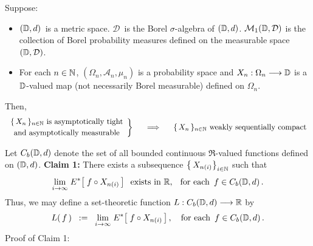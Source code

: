\begin{theorem}
\mbox{}\vskip 0.1cm
\noindent
Suppose:
\begin{itemize}
\item
	$(\mathbb{D},d)$\, is a metric space.
	$\mathcal{D}$\, is the Borel $\sigma$-algebra of $(\mathbb{D},d)$.
	\vskip 0.0cm
	$\mathcal{M}_{1}(\mathbb{D},\mathcal{D})$ is the collection of Borel probability measures
	defined on the measurable space $(\mathbb{D},\mathcal{D})$.
\item
	For each $n \in \mathbb{N}$,
	$(\Omega_{n},\mathcal{A}_{n},\mu_{n})$ is a probability space and
	$X_{n} : \Omega_{n} \longrightarrow \mathbb{D}$
	is a $\mathbb{D}$-valued map (not necessarily Borel measurable) defined on $\Omega_{n}$.
\end{itemize}
Then,
\begin{equation*}
	\left.\begin{array}{c}
	\textnormal{$\{\,X_{n}\,\}_{n\in\N}$ is asymptotically tight}
	\\
	\overset{{\color{white}.}}{\textnormal{and asymptotically measurable}}
	\end{array}\right\}
\quad\;\;\Longrightarrow\quad
	\begin{array}{c}
	\textnormal{$\{\,X_{n}\,\}_{n\in\N}$ weakly sequentially compact}
	\end{array}
\end{equation*}
\end{theorem}
\proof
Let $C_{b}(\mathbb{D},d)$ denote the set of all bounded continuous $\Re$-valued
functions defined on $(\mathbb{D},d)$.
\vskip 0.3cm
\noindent
\textbf{Claim 1:}\;\;
There exists a subsequence $\left\{\,X_{n(i)}\right\}_{i\in\mathbb{N}}$ such that
\begin{equation*}
\underset{i\rightarrow\infty}{\lim}\; E^{*}\!\left[\; f \circ X_{n(i)} \,\right]
\;\;\textnormal{exists in $\mathbb{R}$, \; for each \,$f \in C_{b}(\mathbb{D},d)$}\,.
\end{equation*}
Thus, we may define a set-theoretic function $L : C_{b}(\mathbb{D},d) \longrightarrow \mathbb{R}$ by
\begin{equation*}
L(\,f\,)
\;\; := \;\;
	\underset{i\rightarrow\infty}{\lim}\; E^{*}\!\left[\; f \circ X_{n(i)} \,\right],
\quad
\textnormal{for each \,$f \in C_{b}(\mathbb{D},d)$}\,.
\end{equation*}
Proof of Claim 1:\;\;


